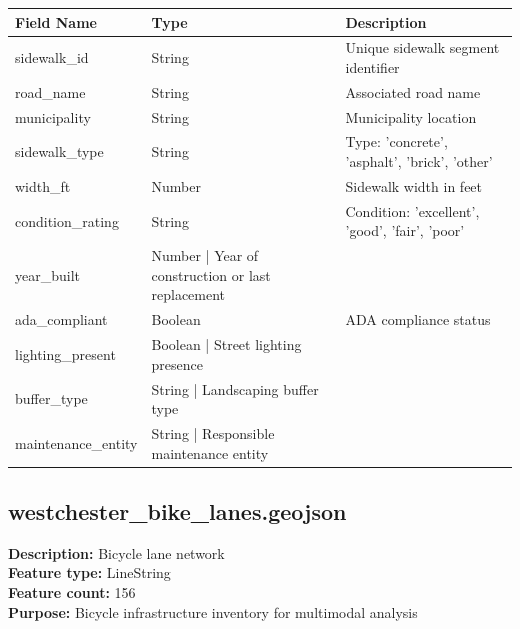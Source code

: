 \documentclass[11pt,letterpaper]{article}
\begin{document}
\begin{table}[h]
\centering
\caption{Attribute Dictionary - westchester\_sidewalks.geojson}
\begin{longtable}{lll}
\toprule
\textbf{Field Name} & \textbf{Type} & \textbf{Description} \\
\midrule
sidewalk\_id & String & Unique sidewalk segment identifier \\
road\_name & String & Associated road name \\
municipality & String & Municipality location \\
sidewalk\_type & String & Type: 'concrete', 'asphalt', 'brick', 'other' \\
width\_ft & Number & Sidewalk width in feet \\
condition\_rating & String & Condition: 'excellent', 'good', 'fair', 'poor' \\
year\_built & Number | Year of construction or last replacement \\
ada\_compliant & Boolean & ADA compliance status \\
lighting\_present & Boolean | Street lighting presence \\
buffer\_type & String | Landscaping buffer type \\
maintenance\_entity & String | Responsible maintenance entity \\
\bottomrule
\end{longtable}
\end{table}

\subsection{westchester\_bike\_lanes.geojson}

\textbf{Description:} Bicycle lane network\\
\textbf{Feature type:} LineString\\
\textbf{Feature count:} 156\\
\textbf{Purpose:} Bicycle infrastructure inventory for multimodal analysis
\end{document}
